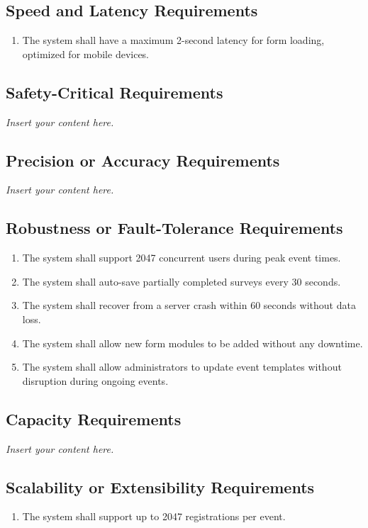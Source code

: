 \documentclass[12pt]{article}
\newcommand{\lips}{\textit{Insert your content here.}}
\begin{document}
\subsection{Speed and Latency Requirements}
\begin{enumerate}[align=left,
  leftmargin=*,
  labelsep=1em,
  itemindent=0em,
  label=\bfseries SL-\arabic*:]
  \item The system shall have a maximum 2-second latency for form loading, optimized for
    mobile devices.
\end{enumerate}
\subsection{Safety-Critical Requirements}
\lips
\subsection{Precision or Accuracy Requirements}
\lips
\subsection{Robustness or Fault-Tolerance Requirements}
\begin{enumerate}[align=left,
  leftmargin=*,
  labelsep=1em,
  itemindent=0em,
  label=\bfseries RF-\arabic*:]
  \item The system shall support 2047 concurrent users during peak event times.
  \item The system shall auto-save partially completed surveys every 30 seconds.
  \item The system shall recover from a server crash within 60 seconds without data loss.
  \item The system shall allow new form modules to be added without any downtime.
  \item The system shall allow administrators to update event templates without disruption
    during ongoing events.
\end{enumerate}
\subsection{Capacity Requirements}
\lips
\subsection{Scalability or Extensibility Requirements}
\begin{enumerate}[align=left,
  leftmargin=*,
  labelsep=1em,
  itemindent=0em,
  label=\bfseries SE-\arabic*:]
  \item The system shall support up to 2047 registrations per event.
\end{enumerate}
\end{document}
